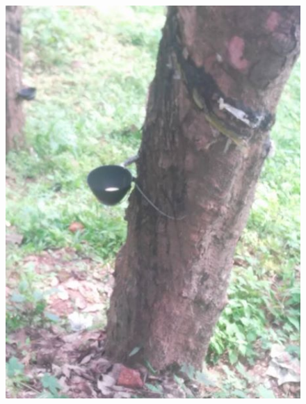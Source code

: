 \documentclass[10pt,a4paper]{report}
\begin{document}
     \begin{figure}[H]
  \center
\includegraphics[scale=.25]{images/nas2}
\label{nas2}
\caption{   }
\end{figure}
\end{document}

